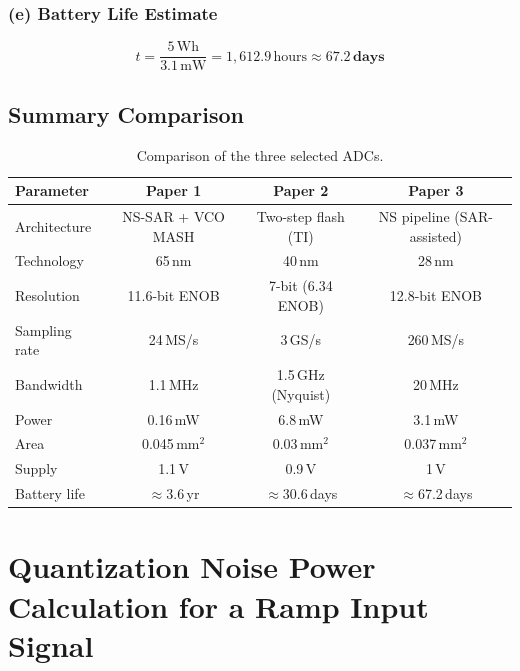 \documentclass{article}
\begin{document}
  \subsubsection*{(e) Battery Life Estimate}
  \[
      t = \frac{5\,\text{Wh}}{3.1\,\text{mW}} = 1{,}612.9\,\text{hours} \approx \mathbf{67.2\,\text{days}}
  \]

  \subsection{Summary Comparison}

  \begin{table}[H]
  \centering
  \caption{Comparison of the three selected ADCs.}
  \begin{tabular}{@{}lccc@{}}
  \toprule
  \textbf{Parameter} & \textbf{Paper 1} & \textbf{Paper 2} & \textbf{Paper 3} \\
  \midrule
  Architecture    & NS-SAR + VCO MASH  & Two-step flash (TI)  & NS pipeline (SAR-assisted) \\
  Technology      & 65\,nm             & 40\,nm               & 28\,nm \\
  Resolution      & 11.6-bit ENOB      & 7-bit (6.34 ENOB)    & 12.8-bit ENOB \\
  Sampling rate   & 24\,MS/s           & 3\,GS/s              & 260\,MS/s \\
  Bandwidth       & 1.1\,MHz           & 1.5\,GHz (Nyquist)   & 20\,MHz \\
  Power           & 0.16\,mW           & 6.8\,mW              & 3.1\,mW \\
  Area            & 0.045\,mm$^2$      & 0.03\,mm$^2$         & 0.037\,mm$^2$ \\
  Supply          & 1.1\,V             & 0.9\,V               & 1\,V \\
  Battery life    & $\approx$3.6\,yr   & $\approx$30.6\,days  & $\approx$67.2\,days \\
  \bottomrule
  \end{tabular}
  \end{table}


  \section{Quantization Noise Power Calculation for a Ramp Input Signal}
\end{document}
